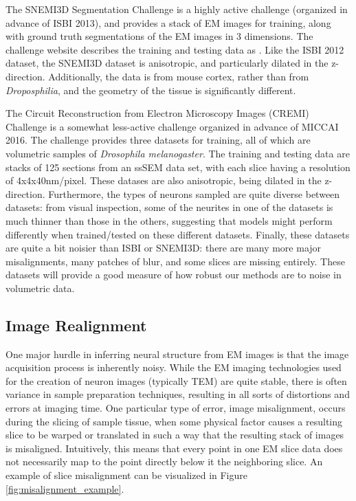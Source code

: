 The SNEMI3D Segmentation Challenge is a highly active challenge (organized in advance of ISBI 2013), and provides a stack of EM images for training, along with ground truth segmentations of the EM images in 3 dimensions. The challenge website describes the training and testing data as \cite{Arganda-Carreras2013}. Like the ISBI 2012 dataset, the SNEMI3D dataset is anisotropic, and particularly dilated in the z-direction. Additionally, the data is from mouse cortex, rather than from \textit{Droposphilia}, and the geometry of the tissue is significantly different. 

The Circuit Reconstruction from Electron Microscopy Images (CREMI) Challenge is a somewhat less-active challenge organized in advance of MICCAI 2016\cite{Funke.Jan2016}. The challenge provides three datasets for training, all of which are volumetric samples of \textit{Drosophila melanogaster}. The training and testing data are stacks of 125 sections from an ssSEM data set, with each slice having a resolution of 4x4x40nm/pixel. These datases are also anisotropic, being dilated in the z-direction. Furthermore, the types of neurons sampled are quite diverse between datasets: from visual inspection, some of the neurites in one of the datasets is much thinner than those in the others, suggesting that models might perform differently when trained/tested on these different datasets. Finally, these datasets are quite a bit noisier than ISBI or SNEMI3D: there are many more major misalignments, many patches of blur, and some slices are missing entirely. These datasets will provide a good measure of how robust our methods are to noise in volumetric data. 

\medskip

\subsection*{Image Realignment}

One major hurdle in inferring neural structure from EM images is that the image acquisition process is inherently noisy. While the EM imaging technologies used for the creation of neuron images (typically TEM) are quite stable, there is often variance in sample preparation techniques, resulting in all sorts of distortions and errors at imaging time. One particular type of error, image misalignment, occurs during the slicing of sample tissue, when some physical factor causes a resulting slice to be warped or translated in such a way that the resulting stack of images is misaligned. Intuitively, this means that every point in one EM slice data does not necessarily map to the point directly below it the neighboring slice. An example of slice misalignment can be visualized in Figure \ref{fig:misalignment_example}.

